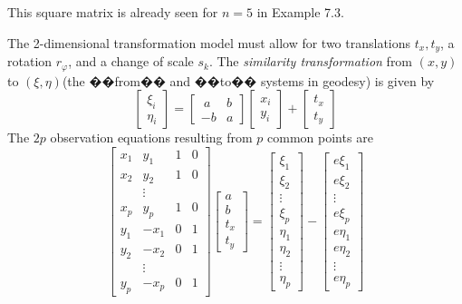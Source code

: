 This square matrix is already seen for $n = 5$ in Example 7.3.
\par
The 2-dimensional transformation model must allow for two translations $t_x, t_y$, a
rotation $r_\varphi$, and a change of scale $s_k$. The \emph{similarity transformation} from $(x , y)$ to $(\xi, \eta)$(the ��from�� and ��to�� systems in geodesy) is given by
\begin{equation}
\begin{bmatrix}
\xi_{i}\\
\eta_{i}
\end{bmatrix}
=
\begin{bmatrix}
\ a & b\\
-b & a
\end{bmatrix}
\begin{bmatrix}
x_i\\
y_i
\end{bmatrix}
+   \begin{bmatrix}
t_x\\
t_y
\end{bmatrix}
\end{equation}
The $2p$ observation equations resulting from $p$ common points are
\begin{equation}
\begin{bmatrix}
x_1 & y_1 & 1 & 0\\
x_2 & y_2 & 1 & 0\\
&\vdots\\
x_p & y_p & 1 & 0\\
y_1 &-x_1 & 0 & 1\\
y_2 &-x_2 & 0 & 1\\
&\vdots\\
y_p &-x_p & 0 & 1
\end{bmatrix}
\begin{bmatrix}
a\\
b\\
t_x\\
t_y
\end{bmatrix}
=
\begin{bmatrix}
\xi_1\\
\xi_2\\
\vdots\\
\xi_p\\
\eta_1\\
\eta_2\\
\vdots\\
\eta_p
\end{bmatrix}
-
\begin{bmatrix}
e\xi_1\\
e\xi_2\\
\vdots\\
e\xi_p\\
e \eta_1\\
e\eta_2\\
\vdots\\
e\eta_p
\end{bmatrix}
\end{equation}
